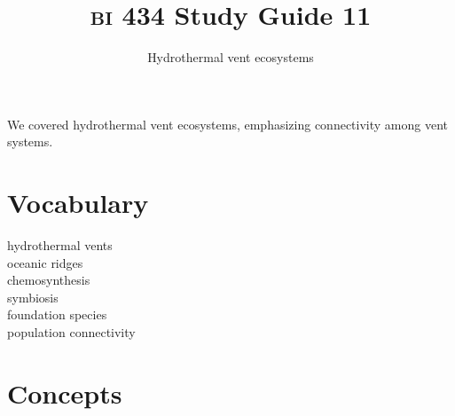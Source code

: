 \documentclass[letterpaper]{tufte-handout}
\title{{\scshape bi} 434 Study Guide 11}
\author{Hydrothermal vent ecosystems}
\date{} %
\begin{document}
\maketitle	%


We covered hydrothermal vent ecosystems, emphasizing connectivity among vent systems.

\section*{Vocabulary}
\begin{multicols}{2}
hydrothermal vents\\
oceanic ridges\\
chemosynthesis\\
symbiosis\\
foundation species \\
population connectivity\\
\end{multicols}
\section*{Concepts}
\end{document}

